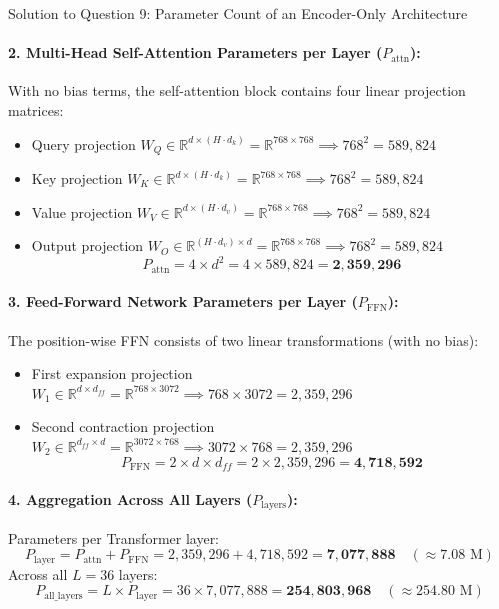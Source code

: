 \documentclass[11pt,a4paper]{article}
\begin{document}
\begin{solutionbox}{Solution to Question 9: Parameter Count of an Encoder-Only Architecture}
\paragraph{2. Multi-Head Self-Attention Parameters per Layer ($P_{\text{attn}}$):}
With no bias terms, the self-attention block contains four linear projection matrices:
\begin{itemize}[leftmargin=1.5em]
    \item Query projection $W_Q \in \mathbb{R}^{d \times (H \cdot d_k)} = \mathbb{R}^{768 \times 768} \implies 768^2 = 589,824$
    \item Key projection $W_K \in \mathbb{R}^{d \times (H \cdot d_k)} = \mathbb{R}^{768 \times 768} \implies 768^2 = 589,824$
    \item Value projection $W_V \in \mathbb{R}^{d \times (H \cdot d_v)} = \mathbb{R}^{768 \times 768} \implies 768^2 = 589,824$
    \item Output projection $W_O \in \mathbb{R}^{(H \cdot d_v) \times d} = \mathbb{R}^{768 \times 768} \implies 768^2 = 589,824$
    \begin{equation}
        P_{\text{attn}} = 4 \times d^2 = 4 \times 589,824 = \mathbf{2,359,296}
    \end{equation}
\end{itemize}

\paragraph{3. Feed-Forward Network Parameters per Layer ($P_{\text{FFN}}$):}
The position-wise FFN consists of two linear transformations (with no bias):
\begin{itemize}[leftmargin=1.5em]
    \item First expansion projection $W_1 \in \mathbb{R}^{d \times d_{ff}} = \mathbb{R}^{768 \times 3072} \implies 768 \times 3072 = 2,359,296$
    \item Second contraction projection $W_2 \in \mathbb{R}^{d_{ff} \times d} = \mathbb{R}^{3072 \times 768} \implies 3072 \times 768 = 2,359,296$
    \begin{equation}
        P_{\text{FFN}} = 2 \times d \times d_{ff} = 2 \times 2,359,296 = \mathbf{4,718,592}
    \end{equation}
\end{itemize}

\paragraph{4. Aggregation Across All Layers ($P_{\text{layers}}$):}
Parameters per Transformer layer:
\begin{equation}
    P_{\text{layer}} = P_{\text{attn}} + P_{\text{FFN}} = 2,359,296 + 4,718,592 = \mathbf{7,077,888} \quad (\approx 7.08\text{ M})
\end{equation}
Across all $L = 36$ layers:
\begin{equation}
    P_{\text{all\_layers}} = L \times P_{\text{layer}} = 36 \times 7,077,888 = \mathbf{254,803,968} \quad (\approx 254.80\text{ M})
\end{equation}


\end{solutionbox}
\end{document}

